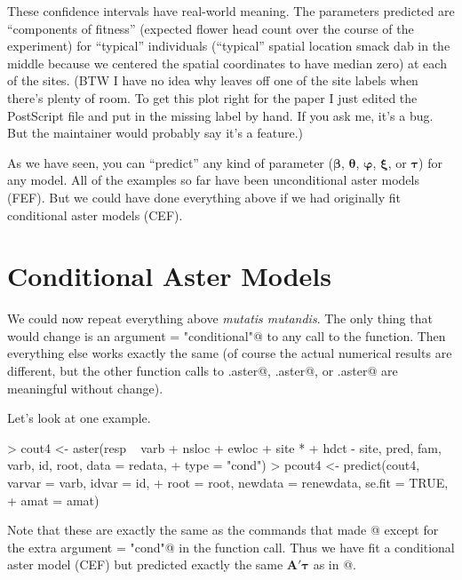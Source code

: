 \documentclass[11pt]{article}
\newcommand{\boldbeta}{{\boldsymbol{\beta}}}
\newcommand{\boldtheta}{{\boldsymbol{\theta}}}
\newcommand{\boldxi}{{\boldsymbol{\xi}}}
\newcommand{\boldtau}{{\boldsymbol{\tau}}}
\newcommand{\boldvarphi}{{\boldsymbol{\varphi}}}
\newcommand{\boldA}{{\mathbf{A}}}
\begin{document}
These confidence intervals have real-world meaning.  The parameters predicted
are ``components of fitness'' (expected flower head count over the course
of the experiment) for ``typical'' individuals (``typical'' spatial location
smack dab in the middle because we centered the spatial coordinates to
have median zero) at each of the sites.  (BTW I have no idea why \verb@axis@
leaves off one of the site labels when there's plenty of room.  To get this
plot right for the paper I just edited the PostScript file and put in the
missing label by hand.  If you ask me, it's a bug.  But the \verb@axis@
maintainer would probably say it's a feature.)

As we have seen, you can ``predict'' any kind of parameter
($\boldbeta$, $\boldtheta$, $\boldvarphi$, $\boldxi$, or $\boldtau$)
for any model.  All of the examples so far have been unconditional
aster models (FEF).  But we could have done everything above if
we had originally fit conditional aster models (CEF).

\section{Conditional Aster Models} \label{sec:conditional}

We could now repeat everything above \emph{mutatis mutandis}.
The only thing that would change is an argument \verb@type = "conditional"@
to any call to the \verb@aster@ function.  Then everything else works
exactly the same (of course the actual numerical results are different,
but the other function calls to \verb@summary.aster@, \verb@anova.aster@,
or \verb@predict.aster@ are meaningful without change).

Let's look at one example.
\begin{Schunk}
\begin{Sinput}
> cout4 <- aster(resp ~ varb + nsloc + ewloc + site * 
+     hdct - site, pred, fam, varb, id, root, data = redata, 
+     type = "cond")
> pcout4 <- predict(cout4, varvar = varb, idvar = id, 
+     root = root, newdata = renewdata, se.fit = TRUE, 
+     amat = amat)
\end{Sinput}
\end{Schunk}
Note that these are exactly the same as the commands that made
@ except for the extra argument \verb@type = "cond"@
in the \verb@aster@ function call.  Thus we have fit a conditional
aster model (CEF) but predicted exactly the same $\boldA' \boldtau$
as in @.
\end{document}
